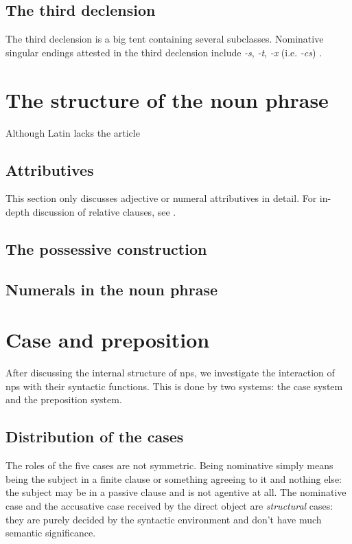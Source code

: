 \documentclass[a4paper, oneside, 12pt]{report}
\newcommand*{\citesec}[1]{\S~{#1}}
\newcommand{\form}[1]{\emph{#1}}
\begin{document}
\subsection{The third declension}\label{sec:np.inflection.3}

The third declension is a big tent containing several subclasses.
Nominative singular endings attested in the third declension
include \form{-s}, \form{-t}, \form{-x} (i.e. \form{-cs}) \citep[\citesec{53}]{allen1903allen}.

\section{The structure of the noun phrase}

Although Latin lacks the article 

\subsection{Attributives}

This section only discusses adjective or numeral attributives in detail.
For in-depth discussion of relative clauses, see .


\subsection{The possessive construction}

\subsection{Numerals in the noun phrase}



\section{Case and preposition}

After discussing the internal structure of \acs{np}s, 
we investigate the interaction of \acs{np}s 
with their syntactic functions.
This is done by two systems: 
the case system and the preposition system.


\subsection{Distribution of the cases}\label{sec:np.case-distribution}

The roles of the five cases are not symmetric.
Being nominative simply means being the subject in a finite clause or something agreeing to it 
and nothing else: 
the subject may be in a passive clause and is not agentive at all.
The nominative case and the accusative case received by the direct object 
are \emph{structural} cases: 
they are purely decided by the syntactic environment 
and don't have much semantic significance.
\end{document}
